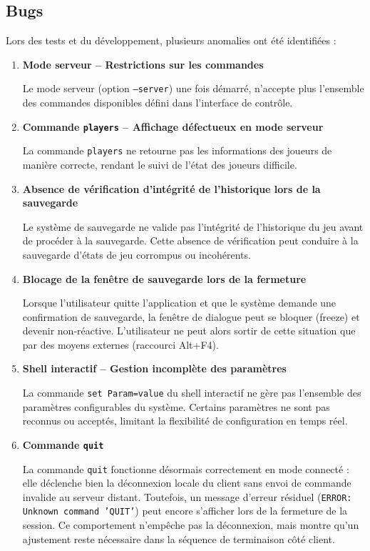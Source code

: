 \documentclass[a4paper]{article}
\begin{document}
\subsection{Bugs}

Lors des tests et du développement, plusieurs anomalies ont été identifiées :

\begin{enumerate}
    \item \textbf{Mode serveur -- Restrictions sur les commandes}
    
    Le mode serveur (option \texttt{---server}) une fois démarré, n'accepte plus l'ensemble 
    des commandes disponibles défini dans l'interface de contrôle. 
    
    \item \textbf{Commande \texttt{players} -- Affichage défectueux en mode serveur}
    
    La commande \texttt{players} ne retourne pas les informations des joueurs de manière correcte, rendant le suivi de l'état des joueurs difficile.

    \item \textbf{Absence de vérification d'intégrité de l'historique lors de la sauvegarde}
    
    Le système de sauvegarde ne valide pas l'intégrité de l'historique du jeu avant de procéder à la sauvegarde. 
    Cette absence de vérification peut conduire à la sauvegarde d'états de jeu corrompus ou incohérents.
    
    \item \textbf{Blocage de la fenêtre de sauvegarde lors de la fermeture}
    
    Lorsque l'utilisateur quitte l'application et que le système demande une confirmation de sauvegarde, 
    la fenêtre de dialogue peut se bloquer (freeze) et devenir non-réactive. L'utilisateur ne peut alors sortir 
    de cette situation que par des moyens externes (raccourci Alt+F4).
    
    \item \textbf{Shell interactif -- Gestion incomplète des paramètres}
    
    La commande \texttt{set Param=value} du shell interactif ne gère pas l'ensemble des paramètres configurables du système. 
    Certains paramètres ne sont pas reconnus ou acceptés, limitant la flexibilité de configuration en temps réel.

    \item \textbf{Commande \texttt{quit}}

    La commande \texttt{quit} fonctionne désormais correctement en mode connecté :
    elle déclenche bien la déconnexion locale du client sans envoi de commande
    invalide au serveur distant. Toutefois, un message d'erreur résiduel
    (\texttt{ERROR: Unknown command 'QUIT'}) peut encore s'afficher lors de la
    fermeture de la session. Ce comportement n'empêche pas la déconnexion, mais
    montre qu'un ajustement reste nécessaire dans la séquence de terminaison côté
    client.


\end{enumerate}
\end{document}
